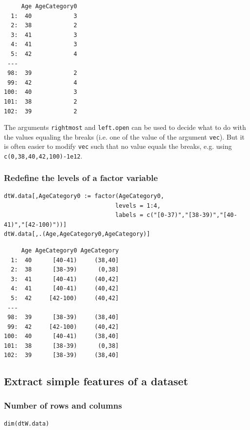 \documentclass{article}
\begin{document}
\begin{verbatim}
     Age AgeCategory0
  1:  40            3
  2:  38            2
  3:  41            3
  4:  41            3
  5:  42            4
 ---                 
 98:  39            2
 99:  42            4
100:  40            3
101:  38            2
102:  39            2
\end{verbatim}

The arguments \texttt{rightmost} and \texttt{left.open} can be used to decide what
to do with the values equaling the breaks (i.e. one of the value of
the argument \texttt{vec}). But it is often easier to modify \texttt{vec} such that no value
equals the breaks, e.g. using \texttt{c(0,38,40,42,100)-1e12}.

\subsubsection{Redefine the levels of a factor variable}
\label{sec:org78f922b}

\lstset{language=r,label= ,caption= ,captionpos=b,numbers=none}
\begin{lstlisting}
dtW.data[,AgeCategory0 := factor(AgeCategory0, 
                                levels = 1:4, 
                                labels = c("[0-37)","[38-39)","[40-41)","[42-100)"))]
dtW.data[,.(Age,AgeCategory0,AgeCategory)]
\end{lstlisting}

\begin{verbatim}
     Age AgeCategory0 AgeCategory
  1:  40      [40-41)     (38,40]
  2:  38      [38-39)      (0,38]
  3:  41      [40-41)     (40,42]
  4:  41      [40-41)     (40,42]
  5:  42     [42-100)     (40,42]
 ---                             
 98:  39      [38-39)     (38,40]
 99:  42     [42-100)     (40,42]
100:  40      [40-41)     (38,40]
101:  38      [38-39)      (0,38]
102:  39      [38-39)     (38,40]
\end{verbatim}

\subsection{Extract simple features of a dataset}
\label{sec:org166e0f9}
\subsubsection{Number of rows and columns}
\label{sec:orgf94d1f8}
\lstset{language=r,label= ,caption= ,captionpos=b,numbers=none}
\begin{lstlisting}
dim(dtW.data)
\end{lstlisting}
\end{document}
